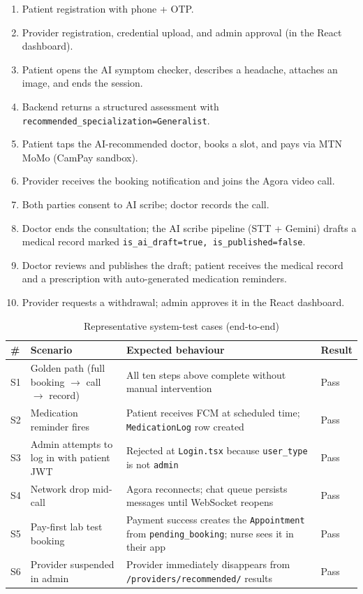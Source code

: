 \begin{enumerate}
  \item Patient registration with phone + OTP.
  \item Provider registration, credential upload, and admin approval (in the React dashboard).
  \item Patient opens the AI symptom checker, describes a headache, attaches an image, and ends the session.
  \item Backend returns a structured assessment with \texttt{recommended\_specialization=Generalist}.
  \item Patient taps the AI-recommended doctor, books a slot, and pays via MTN MoMo (CamPay sandbox).
  \item Provider receives the booking notification and joins the Agora video call.
  \item Both parties consent to AI scribe; doctor records the call.
  \item Doctor ends the consultation; the AI scribe pipeline (STT + Gemini) drafts a medical record marked \texttt{is\_ai\_draft=true, is\_published=false}.
  \item Doctor reviews and publishes the draft; patient receives the medical record and a prescription with auto-generated medication reminders.
  \item Provider requests a withdrawal; admin approves it in the React dashboard.
\end{enumerate}

\begin{table}[H]
\centering
\caption{Representative system-test cases (end-to-end)}
\label{tab:system-tests}
\small
\begin{tabularx}{\textwidth}{|p{0.6cm}|p{4.8cm}|X|p{1.4cm}|}
\hline
\textbf{\#} & \textbf{Scenario} & \textbf{Expected behaviour} & \textbf{Result} \\ \hline

S1 & Golden path (full booking $\rightarrow$ call $\rightarrow$ record) & All ten steps above complete without manual intervention & Pass \\ \hline
S2 & Medication reminder fires & Patient receives FCM at scheduled time; \texttt{MedicationLog} row created & Pass \\ \hline
S3 & Admin attempts to log in with patient JWT & Rejected at \texttt{Login.tsx} because \texttt{user\_type} is not \texttt{admin} & Pass \\ \hline
S4 & Network drop mid-call & Agora reconnects; chat queue persists messages until WebSocket reopens & Pass \\ \hline
S5 & Pay-first lab test booking & Payment success creates the \texttt{Appointment} from \texttt{pending\_booking}; nurse sees it in their app & Pass \\ \hline
S6 & Provider suspended in admin & Provider immediately disappears from \texttt{/providers/recommended/} results & Pass \\ \hline

\end{tabularx}
\end{table}

